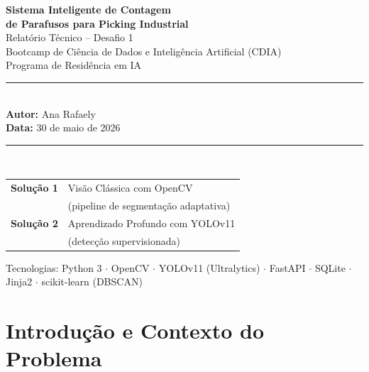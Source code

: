 \documentclass[12pt,a4paper]{article}
\begin{document}
\begin{titlepage}
  \centering
  \vspace*{1.8cm}
  {\huge\bfseries\color{primary}
    Sistema Inteligente de Contagem\\[0.4em]
    de Parafusos para Picking Industrial\\[1.2em]}
  {\large\color{darkgray}
    Relat\'orio T\'ecnico -- Desafio 1\\
    Bootcamp de Ci\^encia de Dados e Intelig\^encia Artificial (CDIA)\\
    Programa de Resid\^encia em IA\\[1.8cm]}
  \rule{\linewidth}{0.5pt}\\[0.4em]
  {\normalsize
    \textbf{Autor:} Ana Rafaely\\[0.3em]
    \textbf{Data:} 30 de maio de 2026\\[0.3em]
  }
  \rule{\linewidth}{0.5pt}\\[1.2cm]
  \begin{tcolorbox}[colback=lightblue, colframe=primary, arc=6pt,
                    title={\bfseries Duas solu\c{c}\~oes desenvolvidas e comparadas}]
    \begin{tabular}{ll}
      \textbf{Solu\c{c}\~ao 1} & Vis\~ao Cl\'assica com OpenCV\\
                                & (pipeline de segmenta\c{c}\~ao adaptativa)\\[4pt]
      \textbf{Solu\c{c}\~ao 2} & Aprendizado Profundo com YOLOv11\\
                                & (detec\c{c}\~ao supervisionada)\\
    \end{tabular}
  \end{tcolorbox}
  \vfill
  {\small\color{gray}
    Tecnologias: Python 3 $\cdot$ OpenCV $\cdot$ YOLOv11 (Ultralytics) $\cdot$
    FastAPI $\cdot$ SQLite $\cdot$ Jinja2 $\cdot$ scikit-learn (DBSCAN)
  }
\end{titlepage}

\tableofcontents
\newpage

\section{Introdu\c{c}\~ao e Contexto do Problema}
\end{document}
